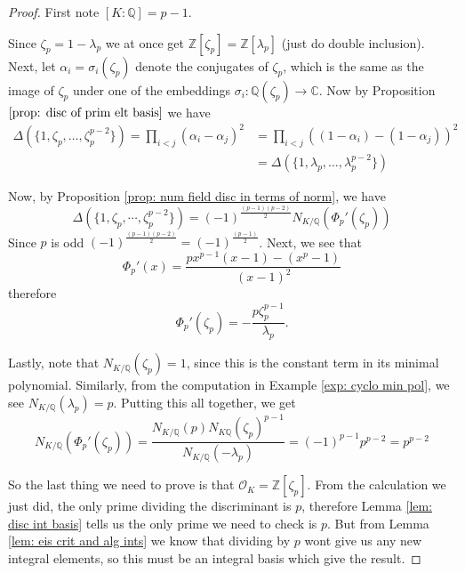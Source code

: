 \documentclass[11pt,a4paper]{report}
\theoremstyle{plain}
\theoremstyle{definition}
\theoremstyle{definition}
\newcommand{\ZZ}{\mathbb{Z}}
\def\CC{\mathbb{C}}
\def\QQ{\mathbb{Q}}
\def \a{\alpha}
\def \lam {\lambda}
\def \OO {\mathcal{O}}
\begin{document}
\begin{proof}
First note $[K:\QQ]=p-1$.

Since $\zeta_p=1-\lam_p$ we at once get $\ZZ[\zeta_p]=\ZZ[\lam_p]$ (just do double inclusion). Next, let $\a_i=\sigma_i(\zeta_p)$ denote the conjugates of $\zeta_p$, which is the same as the image of $\zeta_p$ under one of the embeddings $\sigma_i: \QQ(\zeta_p) \to \CC$. Now  by Proposition $\ref{prop: disc of prim elt basis}$ we have \begin{align*}\Delta(\{1,\zeta_p,\dots,\zeta_p^{p-2}\})=\prod_{i < j}  (\a_i-\a_j)^2 &=\prod_{i < j}  ((1-\a_i)-(1-\a_j))^2\\&=\Delta(\{1,\lam_p,\dots,\lam_p^{p-2}\})\end{align*}

Now, by Proposition \ref{prop: num field disc in terms of norm}, we have \[\Delta(\{1,\zeta_p,\cdots,\zeta_p^{p-2}\})=(-1)^{\frac{(p-1)(p-2)}{2}}N_{K/\QQ}(\Phi_p'(\zeta_p)  )\]
Since $p$ is odd $(-1)^{\frac{(p-1)(p-2)}{2}}=(-1)^{\frac{(p-1)}{2}}$. Next, we see that \[\Phi_p'(x)=\frac{px^{p-1}(x-1)-(x^p-1)}{(x-1)^2}\] therefore \[\Phi_p'(\zeta_p)=-\frac{p\zeta_p^{p-1}}{\lam_p}.\]

Lastly, note that $N_{K/\QQ}(\zeta_p)=1$, since this is the constant term in its minimal polynomial. Similarly, from the computation in Example \ref{exp: cyclo min pol}, we see $N_{K/\QQ}(\lam_p)=p$. Putting this all together, we get \[N_{K/\QQ}(\Phi_p'(\zeta_p)  )=\frac{N_{K/\QQ}(p)N_{K\QQ}(\zeta_p)^{p-1}}{N_{K/\QQ}(-\lam_p)}=(-1)^{p-1}p^{p-2}=p^{p-2}\]

So the last thing we need to prove is that $\OO_K=\ZZ[\zeta_p]$. From the calculation we just did, the only prime dividing the discriminant is $p$, therefore Lemma \ref{lem: disc int basis} tells us the only prime we need to check is $p$. But from Lemma \ref{lem: eis crit and alg ints} we know that dividing by $p$ wont give us any new integral elements, so this must be an integral basis which give the result.



\end{proof}
\end{document}
